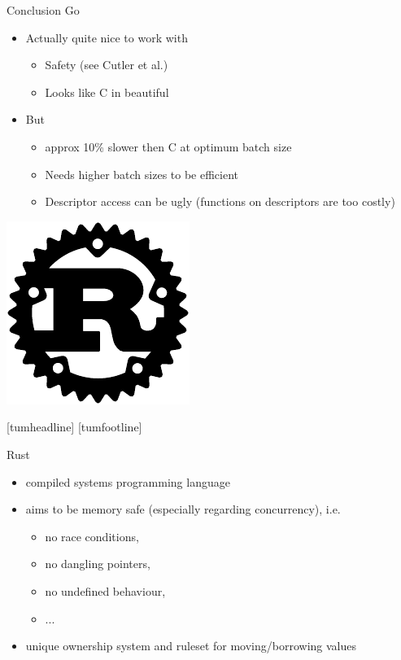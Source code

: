 \documentclass[NET,english,aspectratio=169,notitleframe]{tumbeamer}
\begin{document}
\begin{frame}{Conclusion Go}
\begin{itemize}
\item Actually quite nice to work with
\begin{itemize}
\item Safety (see Cutler et al.)
\item Looks like C in beautiful
\end{itemize}
\item<2-> But
\begin{itemize}
\item<2-> approx 10\% slower then C at optimum batch size
\item<2-> Needs higher batch sizes to be efficient
\item<2-> Descriptor access can be ugly (functions on descriptors are too costly)
\end{itemize}
\end{itemize}
\end{frame}

\begin{frame}{}
\centering\includegraphics[height=0.87\textheight]{pics/rust}
\end{frame}
[tumheadline]
[tumfootline]

\begin{frame}{Rust}
\begin{itemize}
\item compiled systems programming language
\item aims to be memory safe (especially regarding concurrency), i.e.
\begin{itemize}
\item no race conditions,
\item no dangling pointers,
\item no undefined behaviour,
\item ...
\end{itemize}
\item unique ownership system and ruleset for moving/borrowing values
\end{itemize}
\end{frame}
\end{document}
